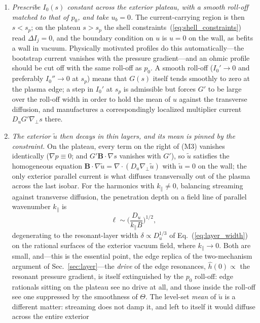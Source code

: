 \documentclass[english]{article}
\newcommand{\bB}{\mathbf{B}}
\newcommand{\gradperp}{\nabla_{\!\perp}}
\begin{document}
\begin{enumerate}
\item \emph{Prescribe $I_0(s)$ constant across the exterior plateau, with a smooth roll-off matched
to that of $p_0$, and take $u_b=0$.} The current-carrying region is then $s<s_p$; on the plateau
$s>s_p$ the shell constraints~(\ref{eq:shell_constraints}) read $\Delta I_j=0$, and the boundary
condition on $u$ is $u=0$ on the wall, as befits a wall in vacuum. Physically motivated profiles do
this automatically---the bootstrap current vanishes with the pressure gradient---and an ohmic
profile should be cut off with the same roll-off as $p_0$. A smooth roll-off ($I_0'\rightarrow0$
and preferably $I_0''\rightarrow0$ at $s_p$) means that $G(s)$ itself tends smoothly to zero at
the plasma edge; a step in $I_0'$ at $s_p$ is admissible but forces $G'$ to be large over the
roll-off width in order to hold the mean of $u$ against the transverse diffusion, and manufactures
a correspondingly localized multiplier current $D_uG'\gradperp s$ there.
\item \emph{The exterior $\tilde u$ then decays in thin layers, and its mean is pinned by the
constraint.} On the plateau, every term on the right of (M3) vanishes identically
($\nabla p\equiv0$; and $G'\bB\cdot\nabla s$ vanishes with $G'$), so $\tilde u$ satisfies the
homogeneous equation $\bB\cdot\nabla\tilde u=\nabla\cdot(D_u\gradperp\tilde u)$ with $\tilde u=0$
on the wall; the only exterior parallel current is what diffuses transversally out of the plasma
across the last isobar. For the harmonics with $k_\parallel\ne0$, balancing streaming against
transverse diffusion, the penetration depth on a field line of parallel wavenumber $k_\parallel$
is
\begin{equation}
\ell\sim\Big(\frac{D_u}{k_\parallel B}\Big)^{1/2},
\label{eq:u_leakage}
\end{equation}
degenerating to the resonant-layer width $\delta\propto D_u^{1/3}$ of
Eq.~(\ref{eq:layer_width}) on the rational surfaces of the exterior vacuum field, where
$k_\parallel\rightarrow0$. Both are small, and---this is the essential point, the edge replica of
the two-mechanism argument of Sec.~\ref{sec:layer}---the \emph{drive} of the edge resonances,
$\hat h(0)\propto$ the resonant pressure gradient, is itself extinguished by the $p_0$ roll-off:
edge rationals sitting on the plateau see no drive at all, and those inside the roll-off see one
suppressed by the smoothness of $\Theta$. The level-set \emph{mean} of $\tilde u$ is a different
matter: streaming does not damp it, and left to itself it would diffuse across the entire exterior

\end{enumerate}
\end{document}
